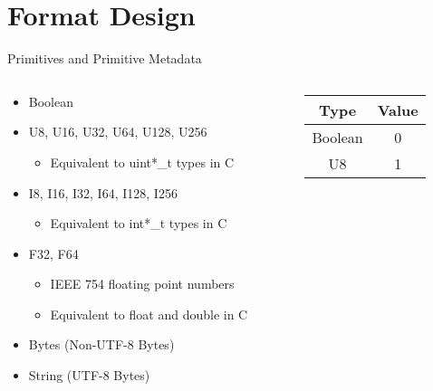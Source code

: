 \documentclass{beamer}
\begin{document}
\section{Format Design}

\begin{frame}{Primitives and Primitive Metadata}
	\begin{columns}
		\begin{column}{0.5\textwidth}
			\begin{itemize}
				\item Boolean
				\item U8, U16, U32, U64, U128, U256
				      \begin{itemize}
					      \item Equivalent to uint*\_t types in C
				      \end{itemize}
				\item I8, I16, I32, I64, I128, I256
				      \begin{itemize}
					      \item Equivalent to int*\_t types in C
				      \end{itemize}
				\item F32, F64
				      \begin{itemize}
					      \item IEEE 754 floating point numbers
					      \item Equivalent to float and double in C
				      \end{itemize}
				\item Bytes  (Non-UTF-8 Bytes)
				\item String (UTF-8 Bytes)
			\end{itemize}
		\end{column}
		\begin{column}{0.25\textwidth}
			\center
			\begin{tabular}{|c|c|}
				\hline
				\textbf{Type} & \textbf{Value} \\
				\hline
				Boolean       & 0              \\
				U8            & 1              \\

\end{tabular}
\end{column}
\end{columns}
\end{frame}
\end{document}
